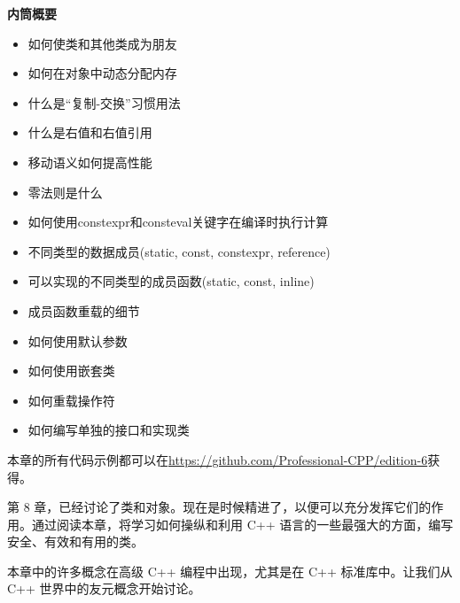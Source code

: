 \noindent
\textbf{内筒概要}

\begin{itemize}
\item
如何使类和其他类成为朋友

\item
如何在对象中动态分配内存

\item
什么是“复制-交换”习惯用法

\item
什么是右值和右值引用

\item
移动语义如何提高性能

\item
零法则是什么

\item
如何使用constexpr和consteval关键字在编译时执行计算

\item
不同类型的数据成员(static, const, constexpr, reference)

\item
可以实现的不同类型的成员函数(static, const, inline)

\item
成员函数重载的细节

\item
如何使用默认参数

\item
如何使用嵌套类

\item
如何重载操作符

\item
如何编写单独的接口和实现类
\end{itemize}

本章的所有代码示例都可以在\url{https://github.com/Professional-CPP/edition-6}获得。

第 8 章，已经讨论了类和对象。现在是时候精进了，以便可以充分发挥它们的作用。通过阅读本章，将学习如何操纵和利用 C++ 语言的一些最强大的方面，编写安全、有效和有用的类。

本章中的许多概念在高级 C++ 编程中出现，尤其是在 C++ 标准库中。让我们从 C++ 世界中的友元概念开始讨论。














